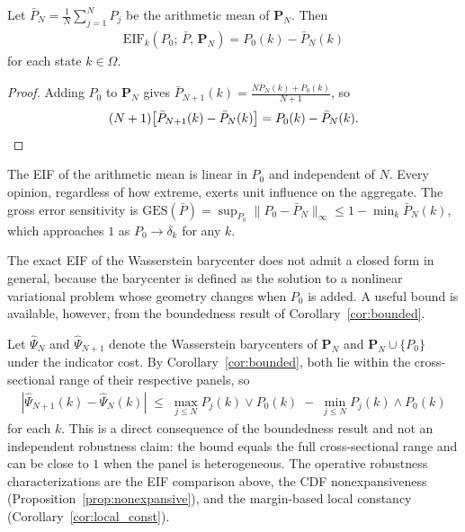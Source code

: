 \begin{proposition}
\label{prop:am_eif}
Let $\bar{P}_N = \frac{1}{N}\sum_{j=1}^N P_j$ be the arithmetic mean of $\mathbf{P}_N$.  Then
\begin{align*}
\mathrm{EIF}_k(P_0;\, \bar{P},\, \mathbf{P}_N) = P_0(k) - \bar{P}_N(k)
\end{align*}
for each state $k \in \Omega$.
\end{proposition}
\begin{proof}
Adding $P_0$ to $\mathbf{P}_N$ gives $\bar{P}_{N+1}(k) = \frac{N\bar{P}_N(k) + P_0(k)}{N+1}$, so
\[
(N+1)\bigl[\bar{P}_{N+1}(k) - \bar{P}_N(k)\bigr] = P_0(k) - \bar{P}_N(k). \qedhere
\]
\end{proof}
\begin{remark}
The EIF of the arithmetic mean is linear in $P_0$ and independent of $N$. Every opinion, regardless of how extreme, exerts unit influence on the aggregate.  The gross error sensitivity is $\mathrm{GES}(\bar{P}) = \sup_{P_0}\|P_0 - \bar{P}_N\|_\infty \leq 1 - \min_k \bar{P}_N(k)$, which approaches $1$ as $P_0 \to \delta_k$ for any $k$.
\end{remark}

The exact EIF of the Wasserstein barycenter does not admit a closed form in general, because the barycenter is defined as the solution to a nonlinear variational problem whose geometry changes when $P_0$ is added.  A useful bound is available, however, from the boundedness result of Corollary~\ref{cor:bounded}.

\begin{remark}
\label{cor:bc_perturb}
Let $\hat\Psi_N$ and $\hat\Psi_{N+1}$ denote the Wasserstein barycenters of $\mathbf{P}_N$ and $\mathbf{P}_N\cup\{P_0\}$ under the indicator cost.  By Corollary~\ref{cor:bounded}, both lie within the cross-sectional range of their respective panels, so
\begin{align*}
\left|\hat\Psi_{N+1}(k) - \hat\Psi_N(k)\right|
\;\leq\; \max_{j\leq N} P_j(k) \vee P_0(k) \;-\; \min_{j\leq N} P_j(k) \wedge P_0(k)
\end{align*}
for each $k$.  This is a direct consequence of the boundedness result and not an independent robustness claim: the bound equals the full cross-sectional range and can be close to $1$ when the panel is heterogeneous.  The operative robustness characterizations are the EIF comparison above, the CDF nonexpansiveness (Proposition~\ref{prop:nonexpansive}), and the margin-based local constancy (Corollary~\ref{cor:local_const}).
\end{remark}


